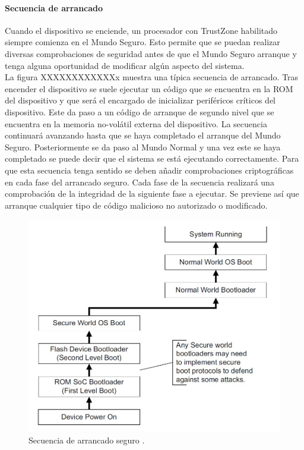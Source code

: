 \paragraph{Secuencia de arrancado}
Cuando el dispositivo se enciende, un procesador con TrustZone habilitado siempre comienza en el Mundo Seguro. Esto permite que se puedan realizar diversas comprobaciones de seguridad antes de que el Mundo Seguro arranque y tenga alguna oportunidad de modificar algún aspecto del sistema.\\
La figura XXXXXXXXXXXXx muestra una típica secuencia de arrancado. Tras encender el dispositivo se suele ejecutar un código que se encuentra en la ROM del dispositivo y que será el encargado de inicializar periféricos críticos del dispositivo. Este da paso a un código de arranque de segundo nivel que se encuentra en la memoria no-volátil externa del dispositivo. La secuencia continuará avanzando hasta que se haya completado el arranque del Mundo Seguro. Posteriormente se da paso al Mundo Normal y una vez este se haya completado se puede decir que el sistema se está ejecutando correctamente.
Para que esta secuencia tenga sentido se deben añadir comprobaciones criptográficas en cada fase del arrancado seguro. Cada fase de la secuencia realizará una comprobación de la integridad de la siguiente fase a ejecutar. Se previene así que arranque cualquier tipo de código malicioso no autorizado o modificado. 

\begin{figure}
	\centering
	\includegraphics[width=1\textwidth]{imagenes/secureboot.jpg}
	\caption{\label{fig1}Secuencia de arrancado seguro \cite{trustzone}.}
\end{figure}

